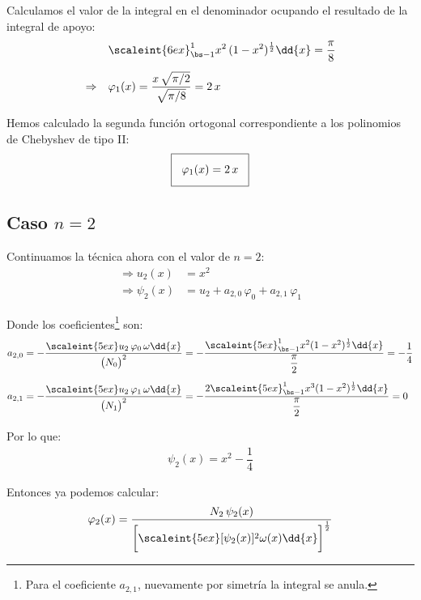 Calculamos el valor de la integral en el denominador ocupando el resultado de  la integral de apoyo:
\begin{align*}
&\scaleint{6ex}_{\bs -1}^{1} x^{2} \, (1 - x^{2})^{\frac{1}{2}} \dd{x} =  \dfrac{\pi}{8} \\[0.5em] 
\Rightarrow \quad &\varphi_{1} (x) = \dfrac{x \, \sqrt{\pi/2}}{\sqrt{\pi/8}} =  2 \, x
\end{align*}    

Hemos calculado la segunda función ortogonal correspondiente a los polinomios de Chebyshev de tipo II:
\begin{align*}
\setlength{\fboxsep}{3\fboxsep}\boxed{
\varphi_{1} (x) = 2 \, x}
\end{align*}

\subsection{Caso \texorpdfstring{$n = 2$}{n = 2}}

Continuamos la técnica ahora con el valor de $n = 2$:
\begin{align*}
\Rightarrow u_{2} (x) &= x^{2} \\[0.5em] 
\Rightarrow \psi_{2} (x) &=  u_{2} + a_{2,0} \, \varphi_{0} + a_{2,1} \, \varphi_{1}
\end{align*}    

Donde los coeficientes\footnote{Para el coeficiente $a_{2, 1}$, nuevamente por simetría la integral se anula.} son:
\begin{align*}
a_{2,0} &=  - \dfrac{\scaleint{5ex} u_{2} \, \varphi_{0} \, \omega \dd{x}}{\big( N_{0} \big)^{2}} =  - \dfrac{\scaleint{5ex}_{\bs -1}^{1} x^{2} (1 - x^{2})^{\frac{1}{2}} \dd{x}}{\dfrac{\pi}{2}} =  - \dfrac{1}{4} \\[0.5em] 
a_{2,1} &=  - \dfrac{\scaleint{5ex} u_{2} \, \varphi_{1} \, \omega \dd{x}}{\big( N_{1} \big)^{2}} = - \dfrac{2 \scaleint{5ex}_{\bs -1}^{1} x^{3} (1 - x^{2})^{\frac{1}{2}} \dd{x}}{\dfrac{\pi}{2}} =  0
\end{align*}    

Por lo que:
\begin{align*}
\psi_{2}(x) = x^{2} - \dfrac{1}{4}
\end{align*}

Entonces ya podemos calcular:
\begin{align*}
\varphi_{2}(x) = \dfrac{N_{2} \, \psi_{2} (x)}{ \bigg[ \scaleint{5ex} [\psi_{2} (x)]^{2} \omega (x) \dd{x} \bigg]^{\frac{1}{2}}}
\end{align*}

